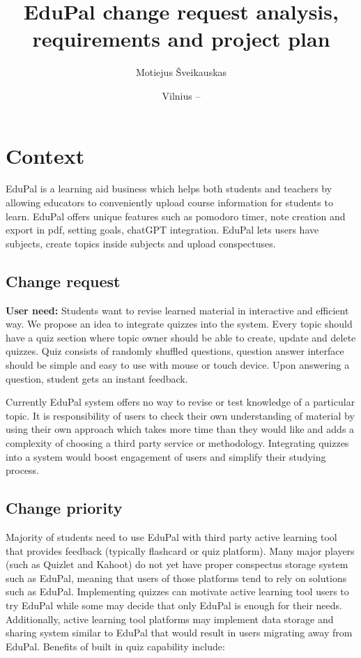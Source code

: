 \documentclass[
    english, %
]{VUMIFPSkursinis}
\title{EduPal change request analysis, requirements and project plan}
\author{Motiejus Šveikauskas}
\date{Vilnius – \the\year}
\begin{document}
\maketitle

\tableofcontents

\section{Context}

EduPal is a learning aid business which helps both students and teachers by allowing educators to conveniently upload course information for students to learn. EduPal offers unique features such as pomodoro timer, note creation and export in pdf, setting goals, chatGPT integration. EduPal lets users have subjects, create topics inside subjects and upload conspectuses.

\subsection{Change request}

\textbf{User need:} Students want to revise learned material in interactive and efficient way. We propose an idea to integrate quizzes into the system. Every topic should have a quiz section where topic owner  should be able to create, update and delete quizzes. Quiz consists of randomly shuffled questions, question answer interface should be simple and easy to use with mouse or touch device. Upon answering a question, student gets an instant feedback.

\vspace{\baselineskip}

Currently EduPal system offers no way to revise or test knowledge of a particular topic. It is responsibility of users to check their own understanding of material by using their own approach which takes more time than they would like and adds a complexity of choosing a third party service or methodology. Integrating quizzes into a system would boost engagement of users and simplify their studying process.

\subsection{Change priority}

Majority of students need to use EduPal with third party active learning tool that provides feedback (typically flashcard or quiz platform). Many major players (such as Quizlet and Kahoot) do not yet have proper conspectus storage system such as EduPal, meaning that users of those platforms tend to rely on solutions such as EduPal. Implementing quizzes can motivate active learning tool users to try EduPal while some may decide that only EduPal is enough for their needs. Additionally, active learning tool platforms may implement data storage and sharing system similar to EduPal that would result in users migrating away from EduPal. Benefits of built in quiz capability include:
\end{document}
